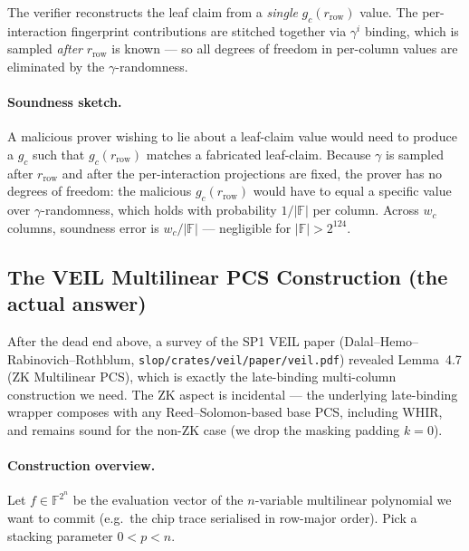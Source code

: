 The verifier reconstructs the leaf claim from a \emph{single}
$g_c(r_{\mathrm{row}})$ value.  The per-interaction fingerprint
contributions are stitched together via $\gamma^i$ binding, which is
sampled \emph{after} $r_{\mathrm{row}}$ is known --- so all degrees
of freedom in per-column values are eliminated by the
$\gamma$-randomness.

\paragraph{Soundness sketch.}
A malicious prover wishing to lie about a leaf-claim value would need
to produce a $g_c$ such that $g_c(r_{\mathrm{row}})$ matches a
fabricated leaf-claim.  Because $\gamma$ is sampled after
$r_{\mathrm{row}}$ and after the per-interaction projections are
fixed, the prover has no degrees of freedom: the malicious
$g_c(r_{\mathrm{row}})$ would have to equal a specific value over
$\gamma$-randomness, which holds with probability $1/|\mathbb{F}|$
per column.  Across $w_c$ columns, soundness error is
$w_c / |\mathbb{F}|$ --- negligible for $|\mathbb{F}| > 2^{124}$.

\subsection{The VEIL Multilinear PCS Construction (the actual answer)}

After the dead end above, a survey of the SP1 VEIL paper
\cite{veil2026} (Dalal--Hemo--Rabinovich--Rothblum,
\texttt{slop/crates/veil/paper/veil.pdf}) revealed Lemma~4.7 (ZK
Multilinear PCS), which is exactly the late-binding multi-column
construction we need.  The ZK aspect is incidental --- the underlying
late-binding wrapper composes with any Reed--Solomon-based base PCS,
including WHIR, and remains sound for the non-ZK case (we drop the
masking padding $k=0$).

\paragraph{Construction overview.}
Let $f \in \mathbb{F}^{2^n}$ be the evaluation vector of the
$n$-variable multilinear polynomial we want to commit (e.g.~the chip
trace serialised in row-major order).  Pick a stacking parameter
$0 < p < n$.

